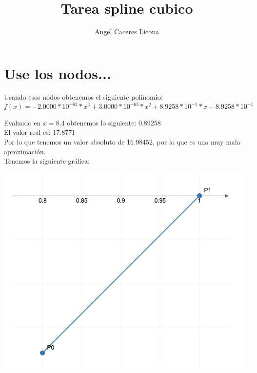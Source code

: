 \documentclass{article}
\begin{document}
\title{Tarea spline cubico}
\author{Angel Caceres Licona}

\maketitle

\section{Use los nodos...}

Usando esos nodos obtenemos el siguiente polinomio:\\

$f(x) = -2.0000 * 10^{-63}* x^3 + 3.0000 * 10^{-63}* x^2 + 8.9258 * 10^{-1}* x -8.9258 * 10^{-1}$

Evaluado en $x=8.4$ obtenemos lo siguiente: 0.89258\\
El valor real es: 17.8771\\
Por lo que tenemos un valor absoluto de 16.98452, por lo que es una muy mala aproximación.\\
Tenemos la siguiente gráfica:\\
\begin{center}
\includegraphics[scale=0.5]{grafica1.png}
\end{center}
\end{document}
